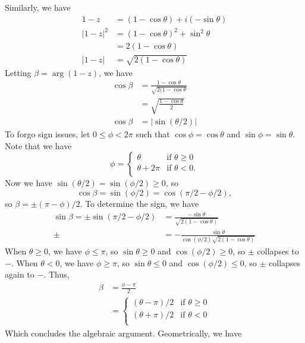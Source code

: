 \documentclass[12pt]{article}
\begin{document}
\begin{answer}
        Similarly, we have
        \begin{align*}
            1-z
            &= (1-\cos\theta)+i(-\sin\theta)\\
            |1-z|^{2}
            &= (1-\cos\theta)^{2} + \sin^{2}\theta\\
            &= 2(1-\cos\theta)\\
            |1-z|
            &= \sqrt{2(1-\cos\theta)}
        \end{align*}
        Letting $\beta=\arg(1-z)$, we have
        \begin{align*}
            \cos\beta
            &= \frac{1-\cos\theta}{\sqrt{2(1-\cos\theta}}\\
            &= \sqrt{\frac{1-\cos\theta}{2}}\\
            \cos\beta
            &= |\sin(\theta/2)|
        \end{align*}
        To forgo sign issues, let $0\le\phi<2\pi$ such that 
        $\cos\phi=\cos\theta$ and $\sin\phi=\sin\theta$. 
        Note that we have
        \[
        \phi = \begin{cases}
            \theta & \text{if }\theta \ge 0\\
            \theta + 2\pi & \text{if }\theta < 0.\\
        \end{cases}
        \]
        Now we have $\sin(\theta/2) = \sin(\phi/2) \ge 0$, so
        \[
            \cos\beta = \sin(\phi/2) = \cos(\pi/2 - \phi/2),
        \]
        so $\beta=\pm(\pi-\phi)/2$. To determine the sign, we have
        \begin{align*}
            \sin\beta = \pm\sin(\pi/2 - \phi/2) 
            &= \frac{-\sin\theta}{\sqrt{2(1-\cos\theta)}}\\
            \pm
            &= -\frac{\sin\theta}{\cos(\phi/2)\sqrt{2(1-\cos\theta)}}
        \end{align*}
        When $\theta\ge 0$, we have $\phi\le\pi$, so
        $\sin\theta \ge 0$ and $\cos(\phi/2) \ge 0$, so $\pm$ collapses to $-$.
        When $\theta<0$, we have $\phi\ge\pi$, so
        $\sin\theta \le 0$ and $\cos(\phi/2) \le 0$, so $\pm$ collapses again to $-$.
        Thus,
        \begin{align*}
            \beta 
            &= \frac{\phi-\pi}{2}\\
            &= \begin{cases}
                (\theta-\pi)/2 & \text{if }\theta \ge 0\\
                (\theta+\pi)/2 & \text{if }\theta < 0\\
            \end{cases}
        \end{align*}
        Which concludes the algebraic argument.
        Geometrically, we have


\end{answer}
\end{document}
